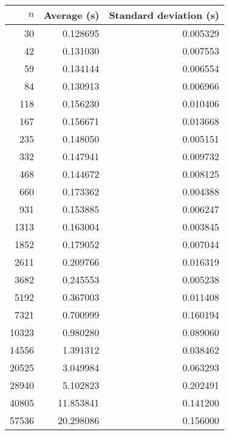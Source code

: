 \begin{tabular}{rrr}
$n$ & Average (s) & Standard deviation (s) \\\hline
30 & 0.128695 & 0.005329\\ 
42 & 0.131030 & 0.007553\\ 
59 & 0.134144 & 0.006554\\ 
84 & 0.130913 & 0.006966\\ 
118 & 0.156230 & 0.010406\\ 
167 & 0.156671 & 0.013668\\ 
235 & 0.148050 & 0.005151\\ 
332 & 0.147941 & 0.009732\\ 
468 & 0.144672 & 0.008125\\ 
660 & 0.173362 & 0.004388\\ 
931 & 0.153885 & 0.006247\\ 
1313 & 0.163004 & 0.003845\\ 
1852 & 0.179052 & 0.007044\\ 
2611 & 0.209766 & 0.016319\\ 
3682 & 0.245553 & 0.005238\\ 
5192 & 0.367003 & 0.011408\\ 
7321 & 0.700999 & 0.160194\\ 
10323 & 0.980280 & 0.089060\\ 
14556 & 1.391312 & 0.038462\\ 
20525 & 3.049984 & 0.063293\\ 
28940 & 5.102823 & 0.202491\\ 
40805 & 11.853841 & 0.141200\\ 
57536 & 20.298086 & 0.156000\\ 
\end{tabular}
